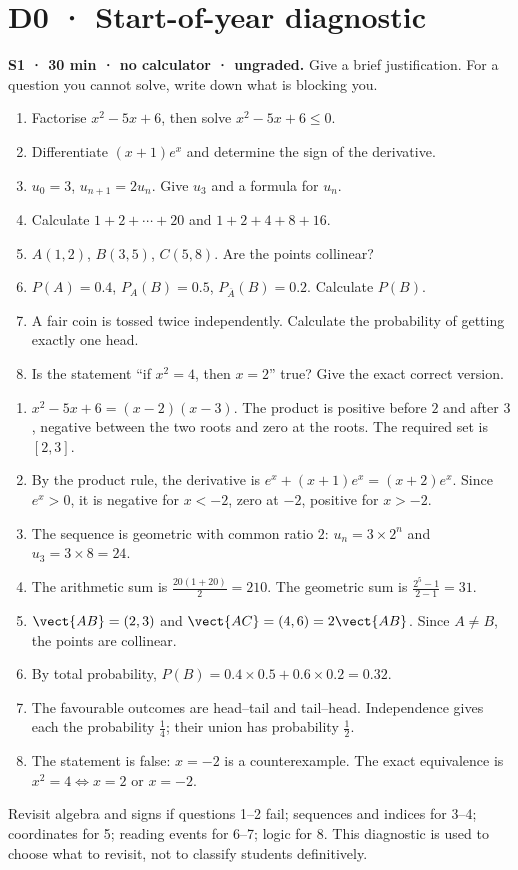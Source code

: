 \mxnewpage\chapter*{D0 · Start-of-year diagnostic}
\textbf{S1 · 30 min · no calculator · ungraded.} Give a brief justification. For a question you cannot solve, write down what is blocking you.
\begin{enumerate}
\item Factorise $x^2-5x+6$, then solve $x^2-5x+6\le0$.
\item Differentiate $(x+1)e^x$ and determine the sign of the derivative.
\item $u_0=3$, $u_{n+1}=2u_n$. Give $u_3$ and a formula for $u_n$.
\item Calculate $1+2+\cdots+20$ and $1+2+4+8+16$.
\item $A(1,2)$, $B(3,5)$, $C(5,8)$. Are the points collinear?
\item $P(A)=0.4$, $P_A(B)=0.5$, $P_{\overline A}(B)=0.2$. Calculate $P(B)$.
\item A fair coin is tossed twice independently. Calculate the probability of getting exactly one head.
\item Is the statement ``if $x^2=4$, then $x=2$'' true? Give the exact correct version.
\end{enumerate}
\ifmxteacher\begin{teachernote}
\begin{enumerate}
\item $x^2-5x+6=(x-2)(x-3)$. The product is positive before $2$ and after $3$, negative between the two roots and zero at the roots. The required set is $[2,3]$.
\item By the product rule, the derivative is $e^x+(x+1)e^x=(x+2)e^x$. Since $e^x>0$, it is negative for $x<-2$, zero at $-2$, positive for $x>-2$.
\item The sequence is geometric with common ratio $2$: $u_n=3\times2^n$ and $u_3=3\times8=24$.
\item The arithmetic sum is $\frac{20(1+20)}{2}=210$. The geometric sum is $\frac{2^5-1}{2-1}=31$.
\item $\vect{AB}=(2,3)$ and $\vect{AC}=(4,6)=2\vect{AB}$. Since $A\ne B$, the points are collinear.
\item By total probability, $P(B)=0.4\times0.5+0.6\times0.2=0.32$.
\item The favourable outcomes are head--tail and tail--head. Independence gives each the probability $\frac{1}{4}$; their union has probability $\frac{1}{2}$.
\item The statement is false: $x=-2$ is a counterexample. The exact equivalence is $x^2=4\Longleftrightarrow x=2\text{ or }x=-2$.
\end{enumerate}
Revisit algebra and signs if questions 1--2 fail; sequences and indices for 3--4; coordinates for 5; reading events for 6--7; logic for 8. This diagnostic is used to choose what to revisit, not to classify students definitively.
\end{teachernote}\fi
\mainmatter


